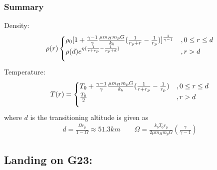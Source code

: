 \documentclass[a4paper,11pt,english]{report}
\begin{document}
\subsubsection{Summary}
Density:
\begin{align}
  \rho (r)
  \begin{cases}
     \rho_{0}[
    1 + \frac{\gamma -1}{\gamma}\frac{\mu
      m_{H}m_{p}G}{k_{b}}(\frac{1}{r_{p}+r} - \frac{1}{r_{p}})
    ]^{\frac{1}{\gamma-1}} &,  0 \le r \le d
    \\
    \vspace{3mm}
    \rho (d)e^{\eta(\frac{1}{r + r_{p}}
      - \frac{1}{r_{p} + d})} &, r > d
  \end{cases}
\end{align}
Temperature:
\begin{align}
  T(r) = 
  \begin{cases}
    T_{0} + \frac{\gamma -1}{\gamma}\frac{\mu
      m_{H}m_{p}G}{k_{b}}
    (\frac{1}{r + r_{p}} - \frac{1}{r_{p}}) &,  0 \le r \le d
    \\
    \vspace{3mm}
    \frac{T_{0}}{2} &, r > d
  \end{cases}
\end{align}
where \(d\) is the transitioning altitude is given as
\begin{align}
  d = \frac{\Omega r_{p}}{1 - \Omega} \approx 51.3km \qquad \Omega =
  \frac{k_{b}T_{0}r_{p}}{
  2\mu m_{H} m_{p}G}(\frac{\gamma}{\gamma-1})
\end{align}

\subsection{Landing on G23:}
\end{document}
